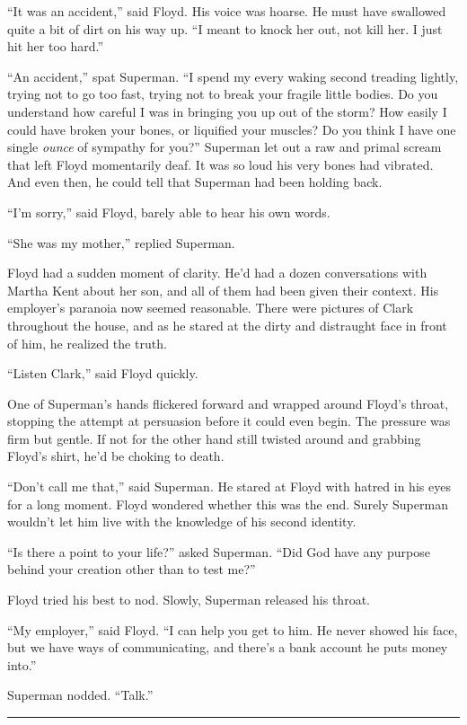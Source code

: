 \documentclass[ebook,12pt]{memoir}
\begin{document}
``It was an accident,'' said Floyd. His voice was hoarse. He must have
swallowed quite a bit of dirt on his way up. ``I meant to knock her out,
not kill her. I just hit her too hard.''

``An accident,'' spat Superman. ``I spend my every waking second
treading lightly, trying not to go too fast, trying not to break your
fragile little bodies. Do you understand how careful I was in bringing
you up out of the storm? How easily I could have broken your bones, or
liquified your muscles? Do you think I have one single \emph{ounce} of
sympathy for you?'' Superman let out a raw and primal scream that left
Floyd momentarily deaf. It was so loud his very bones had vibrated. And
even then, he could tell that Superman had been holding back.

``I'm sorry,'' said Floyd, barely able to hear his own words.

``She was my mother,'' replied Superman.

Floyd had a sudden moment of clarity. He'd had a dozen conversations
with Martha Kent about her son, and all of them had been given their
context. His employer's paranoia now seemed reasonable. There were
pictures of Clark throughout the house, and as he stared at the dirty
and distraught face in front of him, he realized the truth.

``Listen Clark,'' said Floyd quickly.

One of Superman's hands flickered forward and wrapped around Floyd's
throat, stopping the attempt at persuasion before it could even begin.
The pressure was firm but gentle. If not for the other hand still
twisted around and grabbing Floyd's shirt, he'd be choking to death.

``Don't call me that,'' said Superman. He stared at Floyd with hatred in
his eyes for a long moment. Floyd wondered whether this was the end.
Surely Superman wouldn't let him live with the knowledge of his second
identity.

``Is there a point to your life?'' asked Superman. ``Did God have any
purpose behind your creation other than to test me?''

Floyd tried his best to nod. Slowly, Superman released his throat.

``My employer,'' said Floyd. ``I can help you get to him. He never
showed his face, but we have ways of communicating, and there's a bank
account he puts money into.''

Superman nodded. ``Talk.''

\begin{center}\rule{0.5\linewidth}{0.5pt}\end{center}
\end{document}
